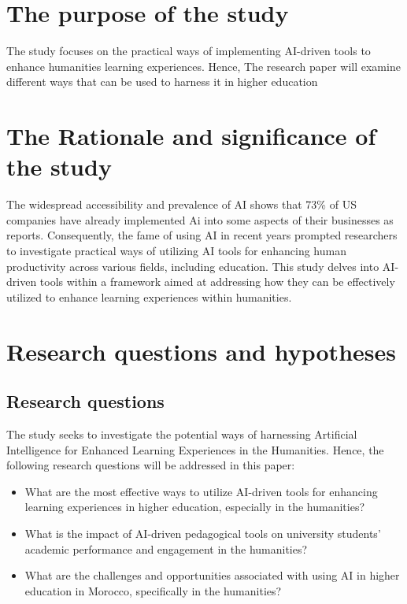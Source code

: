 \section{The purpose of the study}\label{sec:the-purpose-of-the-study}
\justifying
The study focuses on the practical ways of implementing AI-driven tools to enhance humanities learning experiences.
Hence, The research paper will examine different ways that can be used to harness it in higher education


\section{The Rationale and significance of the study}\label{sec:the-rationale-and-significance-of-the-study}
\justifying
The widespread accessibility and prevalence of AI shows that 73\% of US companies have already
implemented Ai into some aspects of their businesses as \textcite{pricewaterhousecoopers} reports.
Consequently, the fame of using AI in recent years prompted researchers to investigate practical
ways of utilizing AI tools for enhancing human productivity across various fields,
including education. This study delves into AI-driven tools within a framework aimed at addressing
how they can be effectively utilized to enhance learning experiences within humanities.

\section{Research questions and hypotheses}\label{sec:research-questions-and-hypotheses}
\subsection{Research questions}\label{subsec:research-questions}
\justifying
The study seeks to investigate the potential ways
of harnessing Artificial Intelligence for
Enhanced Learning Experiences in the Humanities.
Hence,
the following research questions will be addressed in this paper:
\begin{itemize}
      \item What are the most effective ways to utilize AI-driven
            tools for enhancing learning experiences in higher education,
            especially in the humanities?
      \item What is the impact of AI-driven pedagogical tools
            on university students' academic performance
            and engagement in the humanities?
      \item What are the challenges and opportunities associated
            with using AI in higher education in Morocco,
            specifically in the humanities?
\end{itemize}
